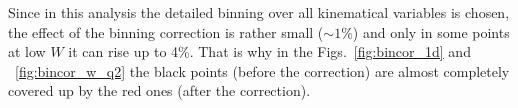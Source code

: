 Since in this analysis the detailed binning over all kinematical variables is chosen, the effect of the binning correction is rather small ($\sim 1\%$) and only in some points at low $W$ it can rise up to 4\%. That is why in the Figs.~\ref{fig:bincor_1d} and ~\ref{fig:bincor_w_q2} the black points (before the correction) are almost completely covered up by the red ones (after the correction).
